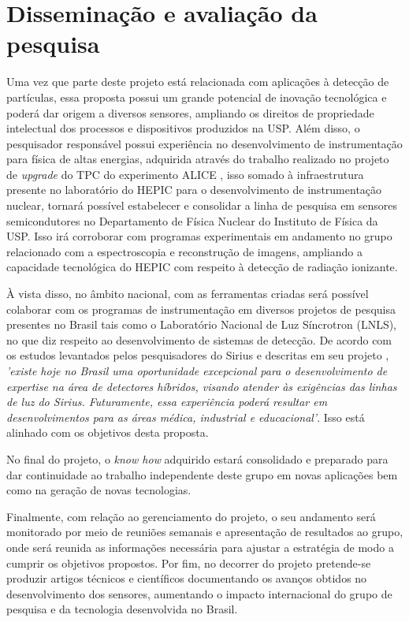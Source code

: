 \chapter{Disseminação e avaliação da pesquisa}

Uma vez que parte deste projeto está relacionada com aplicações à detecção de partículas, essa proposta possui um grande potencial de inovação tecnológica e poderá dar origem a diversos sensores, ampliando os direitos de propriedade intelectual dos processos e dispositivos produzidos na USP. Além disso, o pesquisador responsável possui experiência no desenvolvimento de instrumentação para física de altas energias, adquirida através do trabalho realizado no projeto de {\it upgrade} do TPC do experimento ALICE \cite{tpcNIM}, isso somado à infraestrutura presente no laboratório do HEPIC para o desenvolvimento de instrumentação nuclear, tornará possível estabelecer e consolidar a linha de pesquisa em sensores semicondutores no Departamento de Física Nuclear do Instituto de Física da USP. Isso irá corroborar com programas experimentais em andamento no grupo relacionado com a espectroscopia e reconstrução de imagens\cite{THGEM,NIM,xray}, ampliando a capacidade tecnológica do HEPIC com respeito à detecção de radiação ionizante. 

À vista disso, no âmbito nacional, com as ferramentas criadas será possível colaborar com os programas de instrumentação em diversos projetos de pesquisa presentes no Brasil tais como o Laboratório Nacional de Luz Síncrotron (LNLS), no que diz respeito ao desenvolvimento de sistemas de detecção. De acordo com os estudos levantados pelos pesquisadores do Sirius e descritas em seu projeto \cite{sirius}, {\it 'existe hoje no Brasil uma oportunidade excepcional para o desenvolvimento de expertise na área de detectores híbridos, visando atender às exigências das linhas de luz do Sirius. Futuramente, essa experiência poderá resultar em desenvolvimentos para as áreas médica, industrial e educacional'}. Isso está alinhado com os objetivos desta proposta.

No final do projeto, o {\it know how} adquirido estará consolidado e preparado para dar continuidade ao trabalho independente deste grupo em novas aplicações bem como na geração de novas tecnologias.

Finalmente, com relação ao gerenciamento do projeto, o seu andamento será monitorado por meio de reuniões semanais e apresentação de resultados ao grupo, onde será reunida as informações necessária para ajustar a estratégia de modo a cumprir os objetivos propostos. Por fim, no decorrer do projeto pretende-se produzir artigos técnicos e científicos documentando os avanços obtidos no desenvolvimento dos sensores, aumentando o impacto internacional do grupo de pesquisa e da tecnologia desenvolvida no Brasil.
